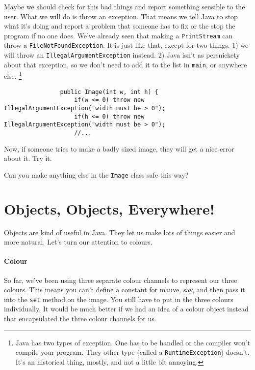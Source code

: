 \documentclass{article}
\begin{document}
            Maybe we should check for this bad things and report something sensible to the user. What we will do is throw an exception.
            That means we tell Java to stop what it's doing and report a problem that someone has to fix or the stop the program if no one
            does. We've already seen that making a \texttt{PrintStream} can throw a \texttt{FileNotFoundException}. It is just like that,
            except for two things. 1) we will throw an \texttt{IllegalArgumentException} instead. 2) Java isn't as persnickety about that
            exception, so we don't need to add it to the list in \texttt{main}, or anywhere else. \footnote{Java has two types of exception. One has
            to be handled or the compiler won't compile your program. They other type (called a \texttt{RuntimeException}) doesn't. It's an
            historical thing, mostly, and not a little bit annoying.}
            
            \begin{verbatim}
                public Image(int w, int h) {
                    if(w <= 0) throw new IllegalArgumentException("width must be > 0");
                    if(h <= 0) throw new IllegalArgumentException("width must be > 0");
                    //...
            \end{verbatim}
            
            Now, if someone tries to make a badly sized image, they will get a nice error about it.  Try it.
            
            Can you make anything else in the \texttt{Image} class safe this way?
            
    \newpage
    \section{Objects, Objects, Everywhere!}
        
        Objects are kind of useful in Java.  They let us make lots of things easier and more natural. Let's turn our attention to colours.
        
        \paragraph{Colour}
            So far, we've been using three separate colour channels to represent our three colours. This means you can't define a constant
            for mauve, say, and then pass it into the \texttt{set} method on the image. You still have to put in the three colours
            individually. It would be much better if we had an idea of a colour object instead that encapsulated the three colour channels
            for us.
        
\end{document}
